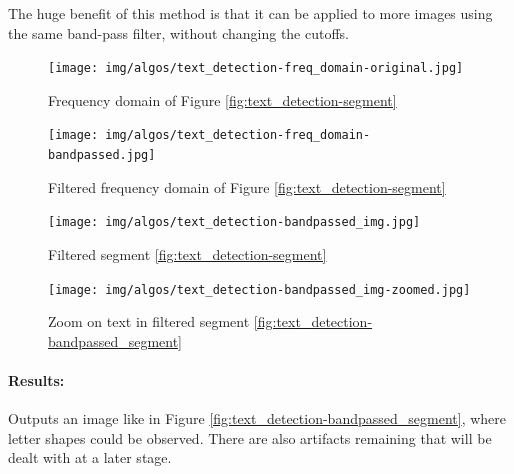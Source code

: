 The huge benefit of this method is that it can be applied to more images using the same band-pass filter, without changing the cutoffs.

\begin{figure}
    \centering
    \begin{minipage}[c]{0.5\linewidth}
        \centering
        \texttt{[image: img/algos/text\_detection-freq\_domain-original.jpg]}
        \caption{Frequency domain of Figure \ref{fig:text_detection-segment}}
        \label{fig:text_detection-freq_domain_original}
    \end{minipage}\hfill
    \begin{minipage}[c]{0.5\linewidth}
        \centering
        \texttt{[image: img/algos/text\_detection-freq\_domain-bandpassed.jpg]}
        \caption{Filtered frequency domain of Figure \ref{fig:text_detection-segment}}
        \label{fig:text_detection-freq_domain_filtered}
    \end{minipage}\hfill
\end{figure}

\begin{figure}
    \centering
    \begin{minipage}[c]{0.37\linewidth}
        \centering
        \texttt{[image: img/algos/text\_detection-bandpassed\_img.jpg]}
        \caption{Filtered segment \ref{fig:text_detection-segment}}
        \label{fig:text_detection-bandpassed_segment}
    \end{minipage}\hfill
    \begin{minipage}[c]{0.63\linewidth}
        \centering
        \texttt{[image: img/algos/text\_detection-bandpassed\_img-zoomed.jpg]}
        \caption{Zoom on text in filtered segment \ref{fig:text_detection-bandpassed_segment}}
        \label{fig:text_detection-bandpassed_segment-zoomed}
    \end{minipage}\hfill
\end{figure}

\paragraph*{Results:}\mbox{}\par
Outputs an image like in Figure \ref{fig:text_detection-bandpassed_segment}, where letter shapes could be observed. There are also artifacts remaining that will be dealt with at a later stage.

